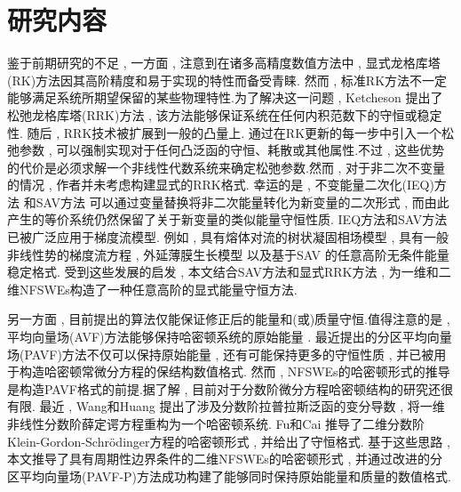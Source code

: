 \section{研究内容}
鉴于前期研究的不足 , 
一方面 , 注意到在诸多高精度数值方法中 , 显式龙格库塔(RK)方法因其高阶精度和易于实现的特性而备受青睐.
然而 , 标准RK方法不一定能够满足系统所期望保留的某些物理特性.为了解决这一问题 , Ketcheson \cite{ketchesonRelaxationRungeKutta2019} 提出了松弛龙格库塔(RRK)方法 , 该方法能够保证系统在任何内积范数下的守恒或稳定性.
随后 , RRK技术被扩展到一般的凸量上\cite{ranochaRelaxationRungeKutta2020}.
通过在RK更新的每一步中引入一个松弛参数 , 可以强制实现对于任何凸泛函的守恒、耗散或其他属性.不过 , 这些优势的代价是必须求解一个非线性代数系统来确定松弛参数.然而 , 对于非二次不变量的情况 , 作者并未考虑构建显式的RRK格式.
幸运的是 , 不变能量二次化(IEQ)方法 \cite{yangLinearUnconditionallyEnergy2017,yangEfficientLinearSchemes2017} 和SAV方法 \cite{chengConvergenceEnergyconservingScheme2022} 可以通过变量替换将非二次能量转化为新变量的二次形式 , 而由此产生的等价系统仍然保留了关于新变量的类似能量守恒性质.
IEQ方法和SAV方法已被广泛应用于梯度流模型\cite{zhaoNumericalApproximationsPhase2017,shenScalarAuxiliaryVariable2018,liuExponentialScalarAuxiliary2020,chengMultipleScalarAuxiliary2018}.
例如 , 具有熔体对流的树状凝固相场模型\cite{chenEfficientNumericalScheme2019} , 具有一般非线性势的梯度流方程\cite{yangConvergenceAnalysisInvariant2020} , 外延薄膜生长模型\cite{chengHighlyEfficientAccurate2019}
以及基于SAV 的任意高阶无条件能量稳定格式\cite{gongArbitrarilyHighorderUnconditionally2020}.
受到这些发展的启发 , 本文结合SAV方法和显式RRK方法 , 为一维和二维NFSWEs构造了一种任意高阶的显式能量守恒方法.

另一方面 , 目前提出的算法仅能保证修正后的能量和(或)质量守恒.值得注意的是 , 平均向量场(AVF)方法\cite{buddGeometricIntegrationUsing1999,quispelNewClassEnergypreserving2008}能够保持哈密顿系统的原始能量 . 
最近提出的分区平均向量场(PAVF)方法\cite{caiPartitionedAveragedVector2018}不仅可以保持原始能量 , 还有可能保持更多的守恒性质 , 并已被用于构造哈密顿常微分方程的保结构数值格式.
然而 , NFSWEs的哈密顿形式的推导是构造PAVF格式的前提.据了解 , 目前对于分数阶微分方程哈密顿结构的研究还很有限.
最近 , Wang和Huang \cite{wangStructurepreservingNumericalMethods2018} 提出了涉及分数阶拉普拉斯泛函的变分导数 , 将一维非线性分数阶薛定谔方程重构为一个哈密顿系统.
Fu和Cai \cite{fuStructurepreservingAlgorithmsTwodimensional2020} 推导了二维分数阶Klein-Gordon-Schr{\"o}dinger方程的哈密顿形式 , 并给出了守恒格式.
基于这些思路 , 本文推导了具有周期性边界条件的二维NFSWEs的哈密顿形式 , 并通过改进的分区平均向量场(PAVF-P)方法成功构建了能够同时保持原始能量和质量的数值格式.

